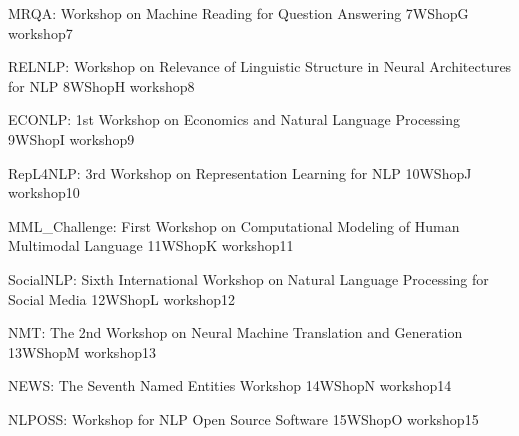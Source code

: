 \begin{wsschedule}
  {MRQA: Workshop on Machine Reading for Question Answering}
  {7}{WShopG}
  {workshop7}
  {\WShopLocG}
  
\end{wsschedule}

\begin{wsschedule}
  {RELNLP: Workshop on Relevance of Linguistic Structure in Neural 
  Architectures for NLP}
  {8}{WShopH}
  {workshop8}
  {\WShopLocH}
  
\end{wsschedule}



\begin{wsschedule}
  {ECONLP: 1st Workshop on Economics and Natural Language Processing}
  {9}{WShopI}
  {workshop9}
  {\WShopLocI}
  
\end{wsschedule}

\begin{wsschedule}
  {RepL4NLP: 3rd Workshop on Representation Learning for NLP}
  {10}{WShopJ}
  {workshop10}
  {\WShopLocJ}
  
\end{wsschedule}

\begin{wsschedule}
  {MML\_Challenge: First Workshop on Computational Modeling of Human 
  Multimodal Language}
  {11}{WShopK}
  {workshop11}
  {\WShopLocK}
  
\end{wsschedule}

\begin{wsschedule}
  {SocialNLP: Sixth International Workshop on Natural Language 
  Processing for Social Media}
  {12}{WShopL}
  {workshop12}
  {\WShopLocL}
  
\end{wsschedule}

\begin{wsschedule}
  {NMT: The 2nd Workshop on Neural Machine Translation and Generation}
  {13}{WShopM}
  {workshop13}
  {\WShopLocM}
  
\end{wsschedule}

\begin{wsschedule}
  {NEWS: The Seventh Named Entities Workshop}
  {14}{WShopN}
  {workshop14}
  {\WShopLocN}
  
\end{wsschedule}

\begin{wsschedule}
  {NLPOSS: Workshop for NLP Open Source Software}
  {15}{WShopO}
  {workshop15}
  {\WShopLocO}
  
\end{wsschedule}

\clearpage{\thispagestyle{emptyheader}\cleardoublepage}
